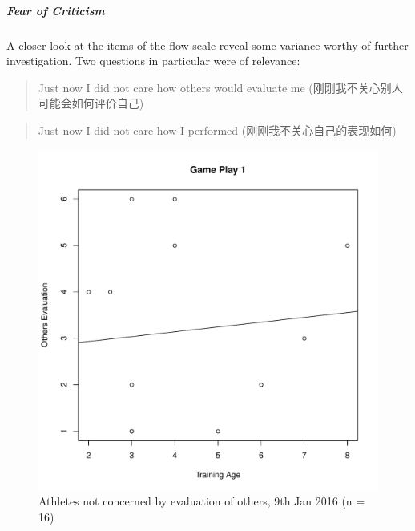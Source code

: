 \begin{CJK}{UTF8}{gbsn}
\subparagraph{Fear of Criticism}

A closer look at the items of the flow scale reveal some variance worthy of further investigation.  Two questions in particular were of relevance:

\begin{quotation}
  Just now I did not care how others would evaluate me
  (刚刚我不关心别人可能会如何评价自己)
\end{quotation}

\begin{quotation}
  Just now I did not care how I performed
  (刚刚我不关心自己的表现如何)
\end{quotation}


\begin{figure}[htbp]
  \centering
\includegraphics[scale=.5]{images/othersEval0109TrainingAge.pdf}
  \caption{Athletes not concerned by evaluation of others, 9th Jan 2016 (n = 16)}
  \label{fig:othersEval0109TrainingAge}
\end{figure}


\end{CJK}
